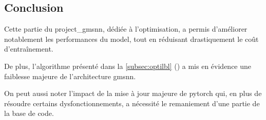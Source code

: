 \subsection{Conclusion}
Cette partie du \gls{project_gmsnn}, dédiée à l'optimisation, a permis d'améliorer notablement les performances du \gls{model}, tout en réduisant drastiquement le coût d'entraînement.%

De plus, l'algorithme présenté dans la \autoref{subsec:optilbl} () a mis en évidence une faiblesse majeure de l'architecture \gls{gmsnn}.

On peut aussi noter l'impact de la mise à jour majeure de \gls{pytorch} qui, en plus de résoudre certains dysfonctionnements, a nécessité le remaniement d'une partie de la base de code.
